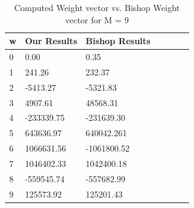 \documentclass[pageno]{jpaper}
\begin{document}
\begin{table}[h!]
  \centering
  \begin{tabular}{llllll|l}
    \hline
    \textbf{w} & \textbf{Our Results}  & \textbf{Bishop Results}  \\
    \hline
    \hline
 0 	&0.00 &0.35 \\
 \hline
1	&241.26 	&232.37 \\
 \hline
2	&-5413.27 	&-5321.83  \\
 \hline
3	&4907.61 	&48568.31 \\
 \hline
4	&-233339.75 	&-231639.30 \\
 \hline
5	&643636.97 	&640042.261 \\
 \hline
6	&1066631.56 	&-1061800.52 \\
 \hline
7	&1046402.33 	&1042400.18 \\
 \hline
8	&-559545.74 	&-557682.99  \\
 \hline
9	&125573.92 	&125201.43 \\
 \hline
  \end{tabular}
  \caption{Computed Weight vector vs. Bishop Weight vector for M = 9}
  \label{table:formatting}
\end{table}
\end{document}
